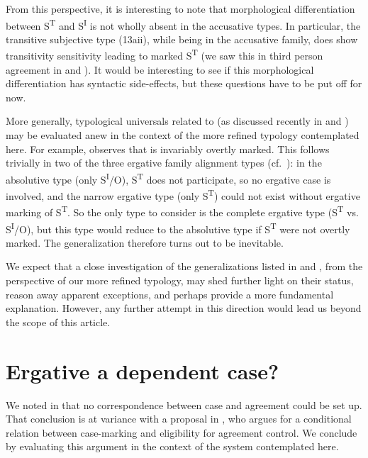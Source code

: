 \documentclass[output=paper]{langsci/langscibook}
\begin{document}
From this perspective, it is interesting to note that morphological
differentiation between S\textsuperscript{T} and S\textsuperscript{I} is not
wholly absent in the accusative  types. In particular, the
transitive subjective type (13aii), while being in the accusative family, does
show transitivity sensitivity leading to marked S\textsuperscript{T} (we saw
this in third person agreement in  and ). It would be
interesting to see if this morphological differentiation has syntactic
side-effects, but these questions have to be put off for now.

More generally, typological universals related to  (as discussed
recently in \citealt{Sheehan2014} and \citealt{Deal2015}) may be evaluated anew
in the context of the more refined  typology contemplated here. For
example, \citet[668]{Deal2015} observes that  is invariably
overtly marked. This follows trivially in two of the three ergative family
alignment types (cf.\ ): in the absolutive type (only
S\textsuperscript{I}/O), S\textsuperscript{T} does not participate, so no
ergative case is involved, and the narrow ergative type (only
S\textsuperscript{T}) could not exist without ergative marking of
S\textsuperscript{T}. So the only type to consider is the complete ergative
type (S\textsuperscript{T} vs. S\textsuperscript{I}/O), but this type would
reduce to the absolutive type if S\textsuperscript{T} were not overtly marked.
The generalization therefore turns out to be inevitable.

We expect that a close investigation of the  generalizations listed
in \citet{Sheehan2014} and \citet{Deal2015}, from the perspective of our more
refined typology, may shed further light on their status, reason away apparent
exceptions, and perhaps provide a more fundamental explanation. However, any
further attempt in this direction would lead us beyond the scope of this
article.

\section{Ergative a dependent case?}\label{sec:11.6}

We noted in  that no correspondence between case and
agreement  could be set up. That conclusion is at variance with a
proposal in \citet{Bobaljik2008}, who argues for a conditional relation between
case-marking and eligibility for agreement control. We conclude by evaluating
this argument in the context of the system contemplated here.
\end{document}
